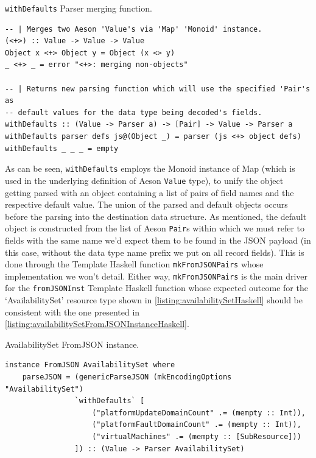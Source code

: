 \documentclass[11pt]{report}
\begin{document}
\begin{listing}[H]
\caption{\texttt{withDefaults} Parser merging function.}
\label{listing:withDefaultsHaskell}
\begin{verbatim}
-- | Merges two Aeson 'Value's via 'Map' 'Monoid' instance.
(<+>) :: Value -> Value -> Value
Object x <+> Object y = Object (x <> y)
_ <+> _ = error "<+>: merging non-objects"

-- | Returns new parsing function which will use the specified 'Pair's as
-- default values for the data type being decoded's fields.
withDefaults :: (Value -> Parser a) -> [Pair] -> Value -> Parser a
withDefaults parser defs js@(Object _) = parser (js <+> object defs)
withDefaults _ _ _ = empty
\end{verbatim}
\end{listing}

As can be seen, \texttt{withDefaults} employs the Monoid instance of Map (which
is used in the underlying definition of Aeson \texttt{Value} type), to unify the
object getting parsed with an object containing a list of pairs of field names
and the respective default value. The union of the parsed and default objects
occurs before the parsing into the destination data structure.
As mentioned, the default object is constructed from the list of Aeson
\texttt{Pair}s within which we must refer to fields with the same
name we'd expect them to be found in the JSON payload (in
this case, without the data type name prefix we put on all record fields). This
is done through the Template Haskell function \texttt{mkFromJSONPairs} whose
implementation we won't detail. Either way, \texttt{mkFromJSONPairs} is the
main driver for the \texttt{fromJSONInst} Template Haskell function whose
expected outcome for the `AvailabilitySet' resource type shown in
\autoref{listing:availabilitySetHaskell} should be consistent with the one
presented in \autoref{listing:availabilitySetFromJSONInstanceHaskell}.

\begin{listing}[H]
\caption{AvailabilitySet FromJSON instance.}
\label{listing:availabilitySetFromJSONInstanceHaskell}
\begin{verbatim}
instance FromJSON AvailabilitySet where
    parseJSON = (genericParseJSON (mkEncodingOptions "AvailabilitySet")
                `withDefaults` [
                    ("platformUpdateDomainCount" .= (mempty :: Int)),
                    ("platformFaultDomainCount" .= (mempty :: Int)),
                    ("virtualMachines" .= (mempty :: [SubResource]))
                ]) :: (Value -> Parser AvailabilitySet)
\end{verbatim}
\end{listing}
\end{document}

